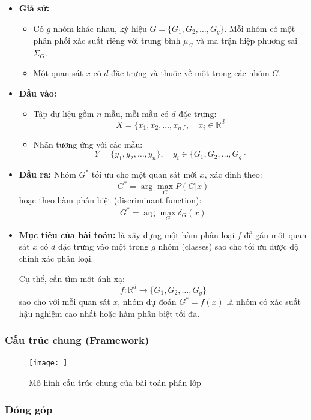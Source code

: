 \documentclass[
  a4paper,
]{article}
\providecommand{\tightlist}{%
  \setlength{\itemsep}{0pt}\setlength{\parskip}{0pt}}
\begin{document}
\begin{itemize}
\item
  \textbf{Giả sử:}

  \begin{itemize}
  \tightlist
  \item
    Có \(g\) nhóm khác nhau, ký hiệu \(G = \{G_1, G_2, \ldots, G_g\}\).
    Mỗi nhóm có một phân phối xác suất riêng với trung bình \(\mu_G\) và
    ma trận hiệp phương sai \(\Sigma_G\).
  \item
    Một quan sát \(x\) có \(d\) đặc trưng và thuộc về một trong các nhóm
    \(G\).
  \end{itemize}
\item
  \textbf{Đầu vào:}

  \begin{itemize}
  \tightlist
  \item
    Tập dữ liệu gồm \(n\) mẫu, mỗi mẫu có \(d\) đặc trưng:
    \[X = \{x_1, x_2, \ldots, x_n\}, \quad x_i \in \mathbb{R}^d\]
  \item
    Nhãn tương ứng với các mẫu:
    \[Y = \{y_1, y_2, \ldots, y_n\}, \quad y_i \in \{G_1, G_2, \ldots, G_g\}\]
  \end{itemize}
\item
  \textbf{Đầu ra:} Nhóm \(G^*\) tối ưu cho một quan sát mới \(x\), xác
  định theo: \[G^* = \arg\max_{G} P(G | x)\] hoặc theo hàm phân biệt
  (discriminant function): \[G^* = \arg\max_{G} \delta_G(x)\]
\item
  \textbf{Mục tiêu của bài toán:} là xây dựng một hàm phân loại \(f\) để
  gán một quan sát \(x\) có \(d\) đặc trưng vào một trong \(g\) nhóm
  (classes) sao cho tối ưu được độ chính xác phân loại.

  Cụ thể, cần tìm một ánh xạ:
  \[f: \mathbb{R}^d \to \{G_1, G_2, \ldots, G_g\}\] sao cho với mỗi quan
  sát \(x\), nhóm dự đoán \(G^* = f(x)\) là nhóm có xác suất hậu nghiệm
  cao nhất hoặc hàm phân biệt tối đa.
\end{itemize}

\subsubsection{Cấu trúc chung
(Framework)}\label{cux1ea5u-truxfac-chung-framework}

\begin{figure}
\centering
\texttt{[image: ]}
\caption{Mô hình cấu trúc chung của bài toán phân lớp}
\end{figure}

\subsubsection{Đóng góp}\label{ux111uxf3ng-guxf3p}
\end{document}
